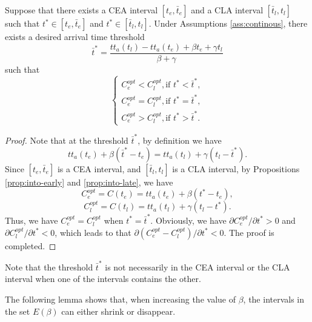 \begin{prop}
Suppose that there exists a CEA interval $[t_e, \bar t_e]$ and a CLA interval $[\bar t_l,  t_l]$ such that $t^* \in [t_e, \bar t_e]$ and $t^* \in [\bar t_l,  t_l]$.  Under Assumptions \ref{ass:continous}, there exists a desired arrival time threshold $$\bar t^* = \frac{tt_a(t_l) - tt_a(t_e) + \beta t_e + \gamma t_l}{\beta + \gamma}$$
   such that 
$$\begin{cases}
   C_e^{opt} < C_l^{opt} ,  \text{if } t^* < \bar t^*, \\
      C_e^{opt} = C_l^{opt}, \text{if }  t^* = \bar t^*, \\
   C_e^{opt} > C_l^{opt},  \text{if }  t^* > \bar t^*.
\end{cases}$$


\end{prop}

\begin{proof}
Note that at the threshold $\bar t^*$, by definition we have $$tt_a(t_e) + \beta(\bar t^* - t_e) = tt_a(t_l) + \gamma(t_l- \bar t^*).$$
Since $[t_e, \bar t_e]$ is a CEA interval, and $[\bar t_l,  t_l]$ is a CLA interval, by Propositions \ref{prop:into-early} and \ref{prop:into-late}, we have $$C_e^{opt} = C(t_e) = tt_a(t_e) + \beta(t^* - t_e), $$ $$C_l^{opt} = C(t_l) = tt_a(t_l) + \gamma( t_l-t^*).$$
Thus, we have $C_e^{opt} = C_l^{opt} $ when $t^* = \bar t^*$. Obviously, we have $\partial C_e^{opt}/\partial t^* >0$ and $\partial C_l^{opt}/\partial t^* <0$, which leads to that $\partial (C_e^{opt} -  C_l^{opt}) /\partial t^* <0 $. The proof is completed. 
\end{proof}

Note that the threshold $\bar t^*$ is not necessarily in the CEA interval or the CLA interval when one of the intervals contains the other.

The following lemma shows that,
when increasing the value of \(\beta\),
the intervals in the set \(E(\beta)\) can either shrink or disappear.

